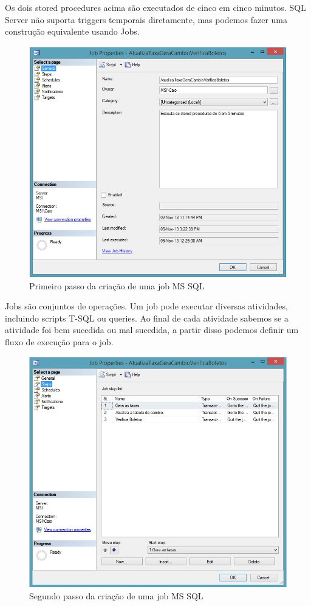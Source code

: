 \documentclass[conference]{IEEEtran}
\begin{document}
  	Os dois stored procedures acima são executados de cinco em cinco minutos. SQL Server não suporta triggers temporais diretamente, mas podemos fazer uma construção equivalente usando Jobs. 

    \begin{figure}[!t]
      \centering
  	  \includegraphics[scale=0.45]{img/job1.jpg}
      \caption{Primeiro passo da criação de uma job MS SQL}
    \end{figure}

  	Jobs são conjuntos de operações. Um job pode executar diversas atividades, incluindo scripts T-SQL ou queries. Ao final de cada atividade sabemos se a atividade foi bem sucedida ou mal sucedida, a partir disso podemos definir um fluxo de execução para o job.
  	
    \begin{figure}[!t]
      \centering
  	  \includegraphics[scale=0.45]{img/job2.jpg}
      \caption{Segundo passo da criação de uma job MS SQL}
    \end{figure}
\end{document}
